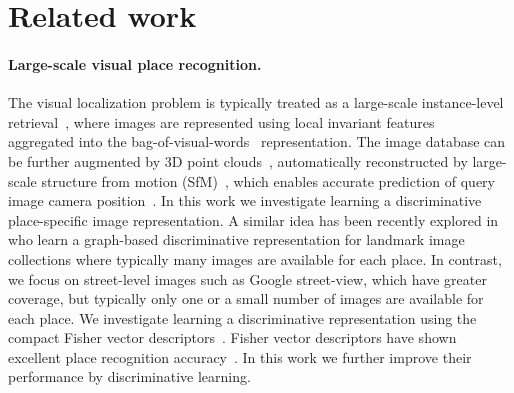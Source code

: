 \documentclass[10pt,twocolumn,letterpaper]{article}
\begin{document}
\section{Related work} 
   \label{sec:related}

   \paragraph{Large-scale visual place recognition.} %
      The visual localization problem is typically treated as a large-scale instance-level retrieval~\cite{Cummins09,Chen11,Gronat13,Knopp2010,Schindler07,Torii2013,Zamir10}, where images are represented using local invariant features~\cite{Lowe04} aggregated into the bag-of-visual-words~\cite{Csurka04,Sivic03} representation. The image database can be further augmented by 3D point clouds~\cite{Klinger13}, automatically reconstructed by large-scale structure from motion (SfM)~\cite{Agarwal-ICCV-2009,Klinger13}, which enables accurate prediction of query image camera position~\cite{Li12,Sattler12}. 
      In this work we investigate learning a discriminative place-specific image representation. A similar idea has been recently explored in~\cite{Cao13} 
      who learn a graph-based discriminative representation for landmark image collections where typically many images are available for each place.
      In contrast, we focus on street-level images such as Google street-view, which have greater coverage, but typically only one or a small number of images are  available for each place.  
      We investigate learning a discriminative representation using the compact Fisher vector descriptors~\cite{Jegou12}. Fisher vector descriptors have shown excellent place recognition accuracy~\cite{Torii2013}. In this work we further improve their performance by discriminative learning.
\end{document}
